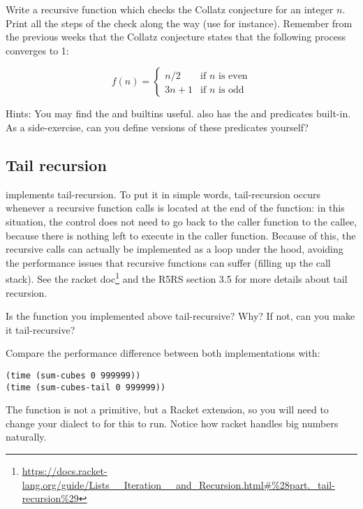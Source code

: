 \documentclass{../../../tp}
\begin{document}
\begin{instruction}	
	
	Write a recursive function  which checks the Collatz conjecture for an integer $n$. Print all the steps of the check along the way (use   for instance). Remember from the previous weeks that the Collatz conjecture states that the following process converges to 1:
	
		\begin{equation*}
		f(n) = 
		\begin{cases}
		n/2 & \text{if $n$ is even} \\
		3n + 1 & \text{if $n$ is odd} 
		\end{cases}
		\end{equation*}
	
	Hints: You may find the  and  builtins useful. \scheme also has the   and  predicates built-in. As a side-exercise, can you define versions of these predicates yourself?
\end{instruction}


\subsection{Tail recursion}

\scheme implements tail-recursion. To put it in simple words, tail-recursion occurs whenever a recursive function calls is located at the end of the function: in this situation, the control does not need to go back to the caller function to the callee, because there is nothing left to execute in the caller function. Because of this, the recursive calls can actually be implemented as a loop under the hood, avoiding the performance issues that recursive functions can suffer (filling up the call stack). See the racket doc\footnote{\url{https://docs.racket-lang.org/guide/Lists\_\_Iteration\_\_and\_Recursion.html\#\%28part._tail-recursion\%29}} and the R5RS section 3.5 for more details about tail recursion.

\begin{instruction}
Is the  function you implemented above tail-recursive? Why? If not, can you make it tail-recursive?

Compare the performance difference between both implementations with:

\begin{verbatim}
(time (sum-cubes 0 999999))
(time (sum-cubes-tail 0 999999))
\end{verbatim}

 
The  function is not a \scheme primitive, but a Racket extension, so you will need to change your dialect to  for this to run. Notice how racket handles big numbers naturally.
\end{instruction}
\end{document}
